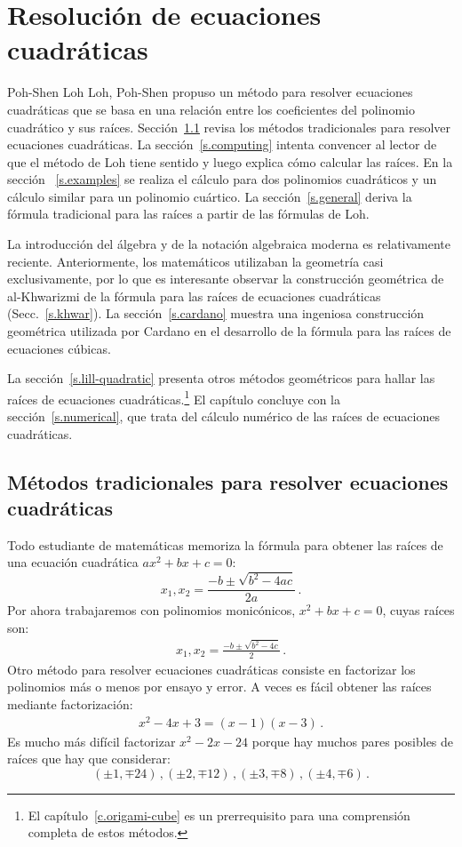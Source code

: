 
\chapter{Resolución de ecuaciones cuadráticas}\label{c.quadratic}


Poh-Shen Loh {{Loh, Poh-Shen}} propuso un método para resolver ecuaciones cuadráticas que se basa en una relación entre los coeficientes del polinomio cuadrático y sus raíces. Sección~\ref{s.traditional} revisa los métodos tradicionales para resolver ecuaciones cuadráticas. 
La sección~\ref{s.computing} intenta convencer al lector de que el método de Loh tiene sentido y luego explica cómo calcular las raíces. En la sección ~\ref{s.examples} se realiza el cálculo para dos polinomios cuadráticos y un cálculo similar para un polinomio cuártico. La sección~\ref{s.general} deriva la fórmula tradicional para las raíces a partir de las fórmulas de Loh.

La introducción del álgebra y de la notación algebraica moderna es relativamente reciente. Anteriormente, los matemáticos utilizaban la geometría casi exclusivamente, por lo que es interesante observar la construcción geométrica de al-Khwarizmi de la fórmula para las raíces de ecuaciones cuadráticas (Secc.~\ref{s.khwar}). La sección~\ref{s.cardano} muestra una ingeniosa construcción geométrica utilizada por Cardano en el desarrollo de la fórmula para las raíces de ecuaciones cúbicas.

La sección~\ref{s.lill-quadratic} presenta otros métodos geométricos para hallar las raíces de ecuaciones cuadráticas.\footnote{El capítulo~\ref{c.origami-cube} es un prerrequisito para una comprensión completa de estos métodos.} El capítulo concluye con la sección~\ref{s.numerical}, que trata del cálculo numérico de las raíces de ecuaciones cuadráticas.

\section{Métodos tradicionales para resolver ecuaciones cuadráticas}\label{s.traditional}
Todo estudiante de matemáticas memoriza la fórmula para obtener las raíces de una ecuación cuadrática $ax^2+bx+c=0$:
\[
x_1, x_2 = \frac{-b\pm\sqrt{b^2-4ac}}{2a}\,.
\]                      
Por ahora trabajaremos con polinomios monicónicos, $x^2+bx+c=0$, cuyas raíces son:
\begin{align}
x_1, x_2 = \frac{-b\pm\sqrt{b^2-4c}}{2}\,.\label{eq.quadratic-roots}
\end{align}
Otro método para resolver ecuaciones cuadráticas consiste en factorizar los polinomios más o menos por ensayo y error. A veces es fácil obtener las raíces mediante factorización:
\begin{align}
x^2-4x+3= (x-1)(x-3)\label{eq.quadratic-lill}\,.
\end{align}
Es mucho más difícil factorizar $x^2-2x-24$ porque hay muchos pares posibles de raíces que hay que considerar:
\[
(\pm 1,\mp 24)\,, (\pm 2,\mp 12)\,, (\pm 3,\mp 8)\,, (\pm 4,\mp 6)\,.
\]

